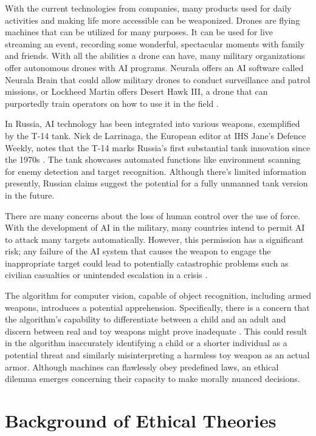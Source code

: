 \documentclass[12pt]{article}
\begin{document}
With the current technologies from companies, many products used for daily activities and making life more accessible can be weaponized. Drones are flying machines that can be utilized for many purposes. It can be used for live streaming an event, recording some wonderful, spectacular moments with family and friends. With all the abilities a drone can have, many military organizations offer autonomous drones with AI programs. Neurala \cite{neurala-no-date} offers an AI software called Neurala Brain that could allow military drones to conduct surveillance and patrol missions, or Lockheed Martin \cite{lockheedmartin} offers Desert Hawk III, a drone that can purportedly train operators on how to use it in the field \cite{roth-2019}.

In Russia, AI technology has been integrated into various weapons, exemplified by the T-14 tank. Nick de Larrinaga, the European editor at IHS Jane’s Defence Weekly, notes that the T-14 marks Russia's first substantial tank innovation since the 1970s \cite{williams-2018}. The tank showcases automated functions like environment scanning for enemy detection and target recognition. Although there's limited information presently, Russian claims suggest the potential for a fully unmanned tank version in the future.

There are many concerns about the loss of human control over the use of force. With the development of AI in the military, many countries intend to permit AI to attack many targets automatically. However, this permission has a significant risk; any failure of the AI system that causes the weapon to engage the inappropriate target could lead to potentially catastrophic problems such as civilian casualties or unintended escalation in a crisis \cite{autoweapon}. 

The algorithm for computer vision, capable of object recognition, including armed weapons, introduces a potential apprehension. Specifically, there is a concern that the algorithm's capability to differentiate between a child and an adult and discern between real and toy weapons might prove inadequate \cite{nationaldefense}. This could result in the algorithm inaccurately identifying a child or a shorter individual as a potential threat and similarly misinterpreting a harmless toy weapon as an actual armor. Although machines can flawlessly obey predefined laws, an ethical dilemma emerges concerning their capacity to make morally nuanced decisions.

\section{Background of Ethical Theories}
\end{document}
